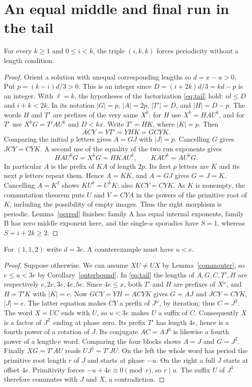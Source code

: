 \section{An equal middle and final run in the tail}\label{tail:diagonal-sec}
\begin{theorem}\label{tail:diagonal}
For every $k\ge1$ and $0\le i<k$, the triple $(i,k,k)$ forces
periodicity without a length condition.
\end{theorem}
\begin{proof}
Orient a solution with unequal corresponding lengths so $d=x-u>0$.
Put $p=(k-i)d/3>0$. This is an integer since $D=(i+2k)d/3=kd-p$
is an integer. With $\ell=k$, the hypotheses of the factorization
\eqref{eq:tail} hold: $id\le D$ and $i+k<2k$.
In its notation $|G|=p$, $|A|=2p$, $|T'|=D$, and $|H|=D-p$.
The words $H$ and $T'$ are prefixes of the very same $X^k$:
for $H$ use $X^k=HAU^k$, and for $T'$ use $X^kG=T'AU^k$
and $D<kx$. Write $T'=HK$, where $|K|=p$.
Then
\[
 ACY=YT'=YHK=GCYK .
\]
Comparing the initial $p$ letters gives $A=GJ$ with $|J|=p$.
Cancelling $G$ gives $JCY=CYK$.
A second use of the equality of the two run exponents gives
\[
 HAU^kG=X^kG=HKAU^k,\qquad KAU^k=AU^kG .
\]
In particular $A$ is the prefix of $KA$ of length $2p$.
Its first $p$ letters are $K$ and its next $p$ letters repeat them.
Hence $A=KK$, and $A=GJ$ gives $G=J=K$.
Cancelling $A=K^2$ shows $KU^k=U^kK$; also $KCY=CYK$.
As $K$ is nonempty, the commutation theorem puts $U$ and
$V=CYA$ in the powers of the primitive root of $K$, including
the possibility of empty images. Thus the right morphism is periodic.
Lemma~\ref{perred} finishes: family A has equal internal exponents,
family B has zero middle exponent here, and the single-$a$ sporadics
have $S=1$, whereas $S=i+2k\ge2$.
\end{proof}

\begin{lemma}\label{tail:112}
For $(1,1,2)$ write $d=3e$. A counterexample must have $u<e$.
\end{lemma}
\begin{proof}
Suppose otherwise. We can assume $XU\ne UX$ by Lemma~\ref{commouter},
so $e\le u<3e$ by Corollary~\ref{outerbound}. In \eqref{eq:tail}
the lengths of $A,G,C,T',H$ are respectively $e,2e,3e,4e,5e$.
Since $4e\le x$, both $T'$ and $H$ are prefixes of $X^\omega$,
and $H=T'K$ with $|K|=e$. Now $GCY=YH=ACYK$ gives $G=AJ$
and $JCY=CYK$, $|J|=e$. The latter equation makes $CY$ a prefix
of $J^\omega$, by iteration; thus $C=J^3$.
The word $X=UC$ ends with $U$, so $u<3e$ makes $U$ a suffix of $C$.
Consequently $X$ is a factor of $J^{\mathbb Z}$ ending at phase zero.
Its prefix $T'$ has length $4e$, hence is a fourth power of a rotation
of $J$. Its conjugate $AC=AJ^3$ is likewise a fourth power of a
length-$e$ word. Comparing the four blocks shows $A=J$ and $G=J^2$.
Finally $XG=T'AU$ reads $UJ^5=T'JU$. On the left the whole word
has period the primitive root length $r$ of $J$ and starts at phase
$-u$. On the right a full $J$ starts at offset $4e$. Primitivity
forces $-u+4e\equiv0\pmod r$, so $r\mid u$. The suffix $U$ of
$J^3$ therefore commutes with $J$ and $X$, a contradiction.
\end{proof}


